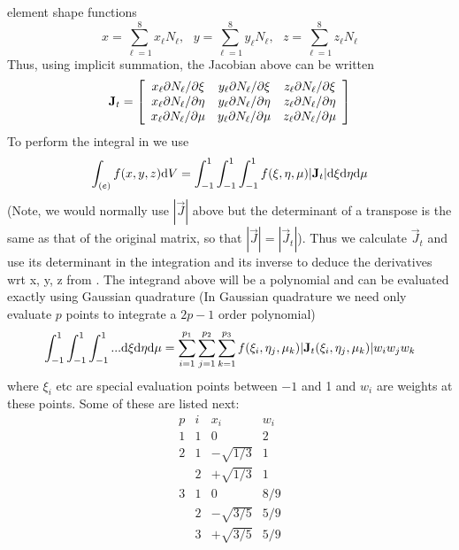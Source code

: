 \documentclass[a4paper]{article}
\begin{document}
element shape functions
\begin{equation}
  x=\sum_{\ell=1}^8 x_\ell N_\ell,~~~
  y=\sum_{\ell=1}^8 y_\ell N_\ell,~~~
  z=\sum_{\ell=1}^8 z_\ell N_\ell
\label{xyz}
\end{equation}
Thus, using implicit summation, the Jacobian above can be written
\begin{equation}
  \mathbf{J}_t=
  \left[  \begin{array}{ccc}
    x_\ell\partial N_\ell/\partial\xi & y_\ell\partial N_\ell/\partial\xi & z_\ell\partial N_\ell/\partial\xi\\
    x_\ell\partial N_\ell/\partial\eta & y_\ell\partial N_\ell/\partial\eta & z_\ell\partial N_\ell/\partial\eta\\
    x_\ell\partial N_\ell/\partial\mu & y_\ell\partial N_\ell/\partial\mu & z_\ell\partial N_\ell/\partial\mu\\
  \end{array}\right]
\end{equation}
To perform the integral in  we use
\begin{equation}
  \int_{(e)} f(x,y,z)\mathrm{d} V=
\int_{-1}^1\int_{-1}^1\int_{-1}^1f(\xi,\eta,\mu)|\mathbf{J}_t|
\mathrm{d}\xi\mathrm{d}\eta\mathrm{d}\mu
\end{equation}
(Note, we would normally use $|\vec J|$ above but the determinant of a
transpose is the same as that of the original matrix, so that $|\vec
J|=|\vec J_t|$). Thus we calculate $\vec J_t$ and use its determinant
in the integration and its inverse to deduce the derivatives wrt x, y,
z from . The integrand above will be a polynomial and can be
evaluated exactly using Gaussian quadrature (In Gaussian quadrature we
need only evaluate $p$ points to integrate a $2p-1$ order polynomial)
\begin{equation}
\int_{-1}^1\int_{-1}^1\int_{-1}^1 ...\mathrm{d}\xi\mathrm{d}\eta\mathrm{d}\mu=
\sum_{i=1}^{p_1}  \sum_{j=1}^{p_2}  \sum_{k=1}^{p_3}
f(\xi_i,\eta_j,\mu_k)|\mathbf{J}_t(\xi_i,\eta_j,\mu_k)|w_iw_jw_k
\end{equation}
where $\xi_i$ etc are special evaluation points between $-1$ and 1 and
$w_i$ are weights at these points. Some of these are listed next: 
\begin{equation}
  \begin{array}{rrrr}
    p & i & x_i & w_i \\ \hline
    1 & 1 & 0 & 2\\ \hline
    2 & 1 & -\sqrt{1/3} & 1\\
      & 2 & +\sqrt{1/3} & 1\\ \hline
    3 & 1 & 0 & 8/9\\
      & 2 & -\sqrt{3/5} & 5/9\\
      & 3 & +\sqrt{3/5} & 5/9
  \end{array}
\end{equation}
\end{document}
